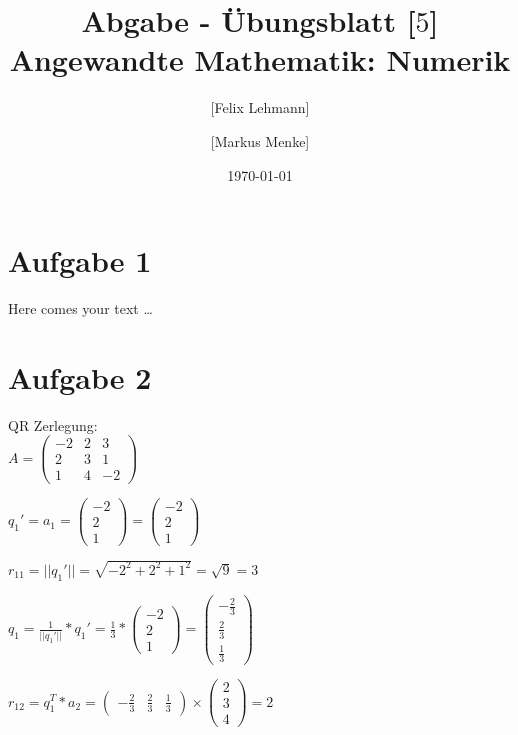 \documentclass[10pt,a4paper]{article}
\begin{document}
\title{Abgabe - Übungsblatt [$5$]\\
\small{Angewandte Mathematik: Numerik}}
\author{ [Felix Lehmann] \and [Markus Menke]}
\date{\today}
\maketitle

\section*{Aufgabe 1}
Here comes your text \ldots

\section*{Aufgabe 2}
QR Zerlegung:\\

$A=\begin{pmatrix}
        -2 & 2 & 3  \\
        2  & 3 & 1  \\
        1  & 4 & -2
    \end{pmatrix}$

$q_1' = a_1 = \begin{pmatrix}
        -2 \\
        2  \\
        1
    \end{pmatrix}=\begin{pmatrix}
        -2 \\
        2  \\
        1
    \end{pmatrix}$

$r_{11}=||q_1'||=\sqrt{-2^2 +2^2 +1^2} = \sqrt{9} = 3$

$q_1=\frac{1}{||q_1'||}*q_1' = \frac{1}{3}*\begin{pmatrix}
        -2 \\
        2  \\
        1
    \end{pmatrix} = \begin{pmatrix}
        -\frac{2}{3} \\
        \frac{2}{3}  \\
        \frac{1}{3}
    \end{pmatrix}$

$r_{12} = q^T_1 * a_2 = \begin{pmatrix}
        -\frac{2}{3} & \frac{2}{3} & \frac{1}{3}
    \end{pmatrix} \times \begin{pmatrix}
        2 \\
        3 \\
        4
    \end{pmatrix}=2$
\end{document}
